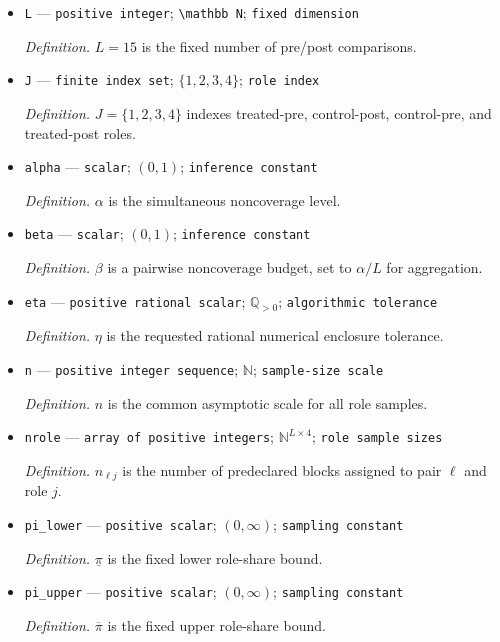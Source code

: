 \documentclass{article}
\begin{document}
\begin{itemize}
  \item \texttt{L} --- \texttt{positive integer}; \texttt{\textbackslash{}\allowbreak{}mathbb N}; \texttt{fixed dimension}
  \par\smallskip\noindent\emph{Definition.} \(L=15\) is the fixed number of pre/post comparisons.
  \item \texttt{J} --- \texttt{finite index set}; \(\{1,2,3,4\}\); \texttt{role index}
  \par\smallskip\noindent\emph{Definition.} \(J=\{1,2,3,4\}\) indexes treated-pre, control-post, control-pre, and treated-post roles.
  \item \texttt{alpha} --- \texttt{scalar}; \((0,1)\); \texttt{inference constant}
  \par\smallskip\noindent\emph{Definition.} \(\alpha\) is the simultaneous noncoverage level.
  \item \texttt{beta} --- \texttt{scalar}; \((0,1)\); \texttt{inference constant}
  \par\smallskip\noindent\emph{Definition.} \(\beta\) is a pairwise noncoverage budget, set to \(\alpha/L\) for aggregation.
  \item \texttt{eta} --- \texttt{positive rational scalar}; \(\mathbb Q_{>0}\); \texttt{algorithmic tolerance}
  \par\smallskip\noindent\emph{Definition.} \(\eta\) is the requested rational numerical enclosure tolerance.
  \item \texttt{n} --- \texttt{positive integer sequence}; \(\mathbb N\); \texttt{sample-\allowbreak{}size scale}
  \par\smallskip\noindent\emph{Definition.} \(n\) is the common asymptotic scale for all role samples.
  \item \texttt{nrole} --- \texttt{array of positive integers}; \(\mathbb N^{L\times4}\); \texttt{role sample sizes}
  \par\smallskip\noindent\emph{Definition.} \(n_{\ell j}\) is the number of predeclared blocks assigned to pair \(\ell\) and role \(j\).
  \item \texttt{pi\_\allowbreak{}lower} --- \texttt{positive scalar}; \((0,\infty)\); \texttt{sampling constant}
  \par\smallskip\noindent\emph{Definition.} \(\underline\pi\) is the fixed lower role-share bound.
  \item \texttt{pi\_\allowbreak{}upper} --- \texttt{positive scalar}; \((0,\infty)\); \texttt{sampling constant}
  \par\smallskip\noindent\emph{Definition.} \(\overline\pi\) is the fixed upper role-share bound.

\end{itemize}
\end{document}
